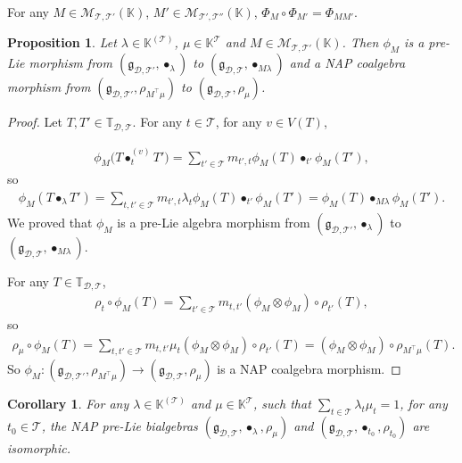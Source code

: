 \documentclass[10pt,a4paper]{amsart}
\numberwithin{equation}{section}
\newtheorem{Corollary}[Theorem]{Corollary}
\newtheorem{Proposition}[Theorem]{Proposition}
 { \theoremstyle{definition}
\newtheorem{Definition}[Theorem]{Definition}
\newtheorem{Note}[Theorem]{Note}
\newtheorem{Example}[Theorem]{Example}
\newtheorem{Remark}[Theorem]{Remark}
\newtheorem{Notation}[Theorem]{Notation}}
\newcommand{\K}{\mathbb{K}}
\newcommand{\T}{\mathcal{T}}
\newcommand{\D}{\mathcal{D}}
\newcommand{\g}{\mathfrak{g}}
\newcommand{\bfT}{\mathbb{T}}
\newcommand{\M}{\mathcal{M}}
\begin{document}
\begin{Remark}
For any $M\in \M_{\T,\T'}(\K)$, $M'\in \M_{\T',\T''}(\K)$, $\Phi_M\circ \Phi_{M'}=\Phi_{MM'}$.
\end{Remark}

\begin{Proposition}
Let $\lambda\in \K^{(\T)}$, $\mu\in \K^\T$ and $M\in \M_{\T,\T'}(\K)$.
Then $\phi_M$ is a pre-Lie morphism from $(\g_{\D,\T'},\bullet_\lambda)$ to $(\g_{\D,\T},\bullet_{M\lambda})$
and a NAP coalgebra morphism from $(\g_{\D,\T'},\rho_{M^\top \mu})$ to $(\g_{\D,\T},\rho_\mu)$.
\end{Proposition}

\begin{proof}
Let $T,T'\in \bfT_{\D,\T}$. For any $t\in \T$, for any $v\in V(T)$,
{\samepage\begin{gather*}
\phi_M\big(T\bullet_t^{(v)} T'\big)=\sum_{t'\in \T} m_{t',t} \phi_M(T)\bullet_{t'} \phi_M(T'),
\end{gather*}
so
\begin{gather*}
\phi_M(T\bullet_\lambda T')=\sum_{t,t'\in \T}m_{t',t}\lambda_t \phi_M(T)\bullet_{t'}\phi_M(T')=\phi_M(T)\bullet_{M\lambda}\phi_M(T').
\end{gather*}
We proved that $\phi_M$ is a pre-Lie algebra morphism from $(\g_{\D,\T'},\bullet_\lambda)$ to $(\g_{\D,\T},\bullet_{M\lambda})$.

}

For any $T \in \bfT_{\D,\T}$,
\begin{gather*}
\rho_t\circ \phi_M(T)=\sum_{t'\in \T} m_{t,t'} (\phi_M\otimes \phi_M)\circ \rho_{t'}(T),
\end{gather*}
so
\begin{gather*}
\rho_\mu\circ \phi_M(T)=\sum_{t,t'\in \T} m_{t,t'} \mu_t (\phi_M\otimes \phi_M)\circ \rho_{t'}(T)
=(\phi_M\otimes \phi_M)\circ \rho_{M^\top \mu}(T).
\end{gather*}
So $\phi_M\colon (\g_{\D,\T'},\rho_{M^\top \mu})\longrightarrow(\g_{\D,\T},\rho_\mu)$ is a NAP coalgebra morphism.
\end{proof}

\begin{Corollary} \label{cor18}
For any $\lambda \in\K^{(\T)}$ and $\mu\in \K^\T$,
such that $\sum_{t\in \T} \lambda_t\mu_t=1$, for any $t_0\in \T$,
the NAP pre-Lie bialgebras $(\g_{\D,\T},\bullet_\lambda,\rho_\mu)$ and $(\g_{\D,\T},\bullet_{t_0},\rho_{t_0})$ are isomorphic.
\end{Corollary}
\end{document}
